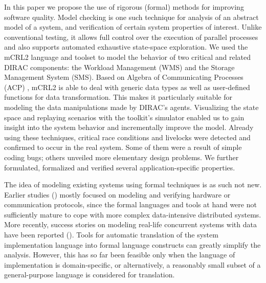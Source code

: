 \documentclass[sort&compress,preprint,3p]{elsarticle}
\begin{document}
In this paper we propose the use of rigorous (formal) methods for improving
software quality. Model checking \cite{ProcessesWithData} is one such technique for analysis of an
abstract model of a system, and verification of certain system properties of
interest. Unlike conventional testing, it allows full control over the execution
of parallel processes and also supports automated exhaustive state-space
exploration. We used the mCRL2 language \cite{FormalLanguagemCRL2} and toolset \cite{mCRL2Toolset} to model the behavior of two
critical and related DIRAC components: the Workload Management (WMS) and the
Storage Management System (SMS). Based on Algebra of Communicating Processes
(ACP) \cite{process_algebra}, mCRL2 is able to deal with generic data types as well as user-defined
functions for data transformation. This makes it particularly suitable for
modeling the data manipulations made by DIRAC's agents. Visualizing the state
space and replaying scenarios with the toolkit's simulator enabled us to gain
insight into the system behavior and incrementally improve the model. 
Already using these techniques, critical race conditions and livelocks were detected and confirmed to
occur in the real system. Some of them were a result of simple coding bugs;
others unveiled more elementary design problems. We further formulated,
formalized and verified several application-specific properties.

The idea of modeling existing systems using 
formal techniques is as such not new. Earlier studies
(\cite{SPIN_case_study,sessionMgmtMasterThesis,desing_validation_protocols,protocol_verification_muCRL,SLAMToolkit,SlidingWindowProtocol,DHCP_SPIN}) mostly focused
on modeling and verifying hardware or communication protocols, since
the formal languages and tools at hand were not sufficiently mature
to cope with more complex data-intensive distributed systems. More
recently, success stories on modeling real-life concurrent systems with
data have been reported (\cite{CMS_LHC, Linux_driver,verstoep_et_al, SystemC_processAlgebra,Java_PathFinder, ACS_mCRL2}).
Tools for automatic translation of the system implementation language into
 formal language constructs can greatly
simplify the analysis. However, this has so far been feasible only when the
language of implementation is domain-specific, or alternatively, a
reasonably small subset of a general-purpose language is considered for
translation. 
\end{document}
